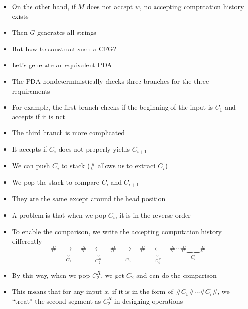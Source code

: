 \begin{frame}[allowframebreaks]
\begin{itemize}
\item On the other hand, if $M$ does not accept $w$, no accepting computation
  history exists
\item [] Then $G$ generates all strings
\item But how to construct such a CFG?
\item Let's generate an equivalent PDA
\item The PDA nondeterministically checks three branches
  for the three requirements
\item For example, the first branch checks if the beginning
  of the input is $C_1$ and
  accepts if it is not
\item The third branch is more complicated
\item It accepts if $C_i$ does not properly yields $C_{i+1}$
\item We can push $C_i$ to stack (\# allows us to extract $C_i$)
\item We pop the stack to compare $C_i$ and $C_{i+1}$
\item They are the same except around the head position
\item A problem is that when we pop $C_i$, it is in
  the reverse order
\item To enable the comparison, we write the accepting
  computation history differently
  \begin{equation*}
    \#\underbrace{\quad \rightarrow \quad}_{C_1}\#\underbrace{\quad \leftarrow \quad}_{C_2^R}\#
    \underbrace{\quad \rightarrow \quad}_{C_3}\#\underbrace{\quad \leftarrow \quad}_{C_4^R}\#
    \cdots\#\underbrace{\qquad}_{C_l}\#
  \end{equation*}
\item By this way, when we pop $C_2^R$, we get $C_2$ and can do the
  comparison
\item This means that for any input $x$, if it is in the form of
  $\#C_1\# \cdots \# C_l\#$, we ``treat'' the second
  segment as $C_2^R$ in designing operations
\end{itemize}
\end{frame}



